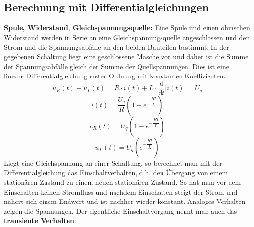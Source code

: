\subsection{Berechnung mit Differentialgleichungen}
\textbf{Spule, Widerstand, Gleichspannungsquelle:} Eine Spule und einen ohmschen Widerstand werden in Serie an eine Gleichspannungsquelle angeschlossen und den Strom und die Spannungsabfälle an den beiden Bauteilen bestimmt. In der gegebenen Schaltung liegt eine geschlossene Masche vor und daher ist die Summe der Spannungsabfälle gleich der Summe der Quellspannungen. Dies ist eine lineare Differentialgleichung erster Ordnung mit konstanten Koeffizienten. 
\begin{equation}
\boxed{u_R\left(t\right)+u_L\left(t\right)=R\cdot i\left(t\right)+L\cdot \dfrac{\text{d}}{\text{d}t}\Big[i\left(t\right)\Big]=U_q}
\end{equation}
\begin{equation}
\boxed{i\left(t\right)=\dfrac{U_q}{R}\left(1-e^{-\dfrac{Rt}{L}}\right)}
\end{equation}
\begin{equation}
\boxed{u_R\left(t\right)=U_q\left(1-e^{-\dfrac{Rt}{L}}\right)}
\end{equation}
\begin{equation}
\boxed{u_L\left(t\right)=U_q\left(e^{-\dfrac{Rt}{L}}\right)}
\end{equation}
Liegt eine Gleichspannung an einer Schaltung, so berechnet man mit der Differentialgleichung das Einschaltverhalten, d.h. den Übergang von einem stationären Zustand zu einem neuen stationären Zustand. So hat man vor dem Einschalten keinen Stromfluss und nachdem Einschalten steigt der Strom und nähert sich einem Endwert und ist nachher wieder konstant. Analoges Verhalten zeigen die Spannungen. Der eigentliche Einschaltvorgang nennt man auch das \textbf{transiente Verhalten}.
